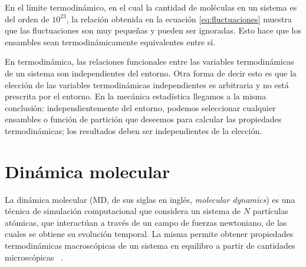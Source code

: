 En el límite termodinámico, en el cual la cantidad de moléculas en un sistema es 
del orden de $10^{23}$, la relación obtenida en la ecuación \ref{eq:fluctuaciones} 
muestra que las fluctuaciones son muy pequeñas y pueden ser ignoradas. Esto hace 
que los ensambles sean termodinámicamente equivalentes entre sí.

En termodinámica, las relaciones funcionales entre las variables termodinámicas 
de un sistema son independientes del entorno. Otra forma de decir esto es que la 
elección de las variables termodinámicas independientes es arbitraria y no está 
prescrita por el entorno. En la mecánica estadística llegamos a la misma 
conclusión: independientemente del entorno, podemos seleccionar cualquier ensambles
o función de partición que deseemos para calcular las propiedades termodinámicas; 
los resultados deben ser independientes de la elección.


\section{Dinámica molecular}\label{md}

La dinámica molecular (MD, de sus siglas en inglés, \textit{molecular dynamics})
es una técnica de simulación computacional que considera un sistema de $N$
partículas atómicas, que interactúan a través de un campo de fuerzas newtoniano,
de las cuales se obtiene su evolución temporal. La misma permite obtener
propiedades termodinámicas macroscópicas de un sistema en equilibro a partir de 
cantidades microscópicas ~\cite{frenkel2001, allen2017}.

